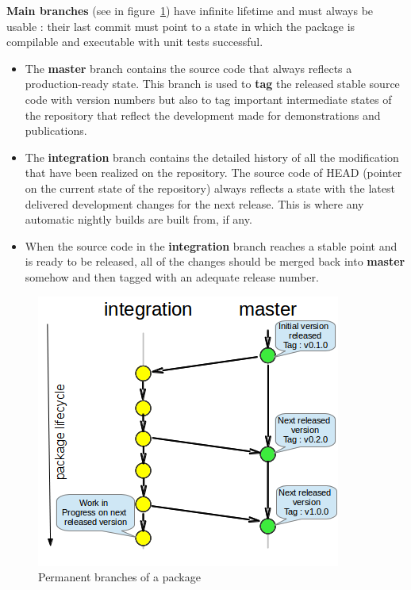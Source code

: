 \documentclass[12pt,a4paper]{article}
\begin{document}
\textbf{Main branches} (see in figure~\ref{fig:perm-branches}) have infinite lifetime and must always be usable : their last commit must point to a state in which the package is compilable and executable with unit tests successful.
\begin{itemize}
\item The \textbf{master} branch contains the source code that always reflects a production-ready state. This branch is used to \textbf{tag} the released stable source code with version numbers but also to tag important intermediate states of the repository that reflect the development made for demonstrations and publications. 
\item The \textbf{integration} branch contains the detailed history of all the modification that have been realized on the repository. The source code of HEAD (pointer on the current state of the repository) always reflects a state with the latest delivered development changes for the next release. This is where any automatic nightly builds are built from, if any.
\item When the source code in the \textbf{integration} branch reaches a stable point and is ready to be released, all of the changes should be merged back into \textbf{master} somehow and then tagged with an adequate release number.
\end{itemize}


\begin{figure}
\center
\includegraphics[scale=1]{images/permanent_branches.png}
\caption{Permanent branches of a package}
\label{fig:perm-branches}
\end{figure}
\end{document}
